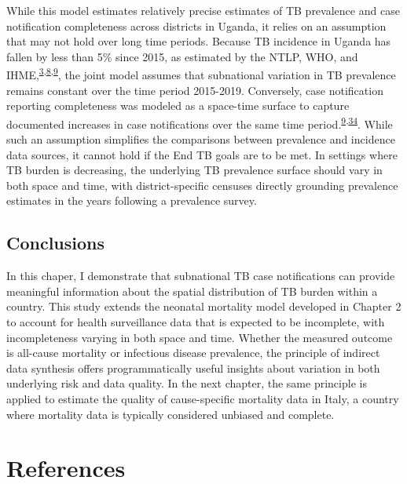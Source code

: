 \documentclass[
]{article}
\begin{document}
While this model estimates relatively precise estimates of TB prevalence and case notification completeness across districts in Uganda, it relies on an assumption that may not hold over long time periods. Because TB incidence in Uganda has fallen by less than 5\% since 2015, as estimated by the NTLP, WHO, and IHME,\textsuperscript{\protect\hyperlink{ref-WorldHealthOrganization2019}{3},\protect\hyperlink{ref-Kyu2018}{8},\protect\hyperlink{ref-UgandaNationalTuberculosisandLeprosyProgramme2020}{9}}, the joint model assumes that subnational variation in TB prevalence remains constant over the time period 2015-2019. Conversely, case notification reporting completeness was modeled as a space-time surface to capture documented increases in case notifications over the same time period.\textsuperscript{\protect\hyperlink{ref-UgandaNationalTuberculosisandLeprosyProgramme2020}{9},\protect\hyperlink{ref-UgandaNationalTuberculosisandLeprosyProgramme2017b}{34}}. While such an assumption simplifies the comparisons between prevalence and incidence data sources, it cannot hold if the End TB goals are to be met. In settings where TB burden is decreasing, the underlying TB prevalence surface should vary in both space and time, with district-specific censuses directly grounding prevalence estimates in the years following a prevalence survey.

\hypertarget{conclusions}{%
\subsection{Conclusions}\label{conclusions}}

In this chaper, I demonstrate that subnational TB case notifications can provide meaningful information about the spatial distribution of TB burden within a country. This study extends the neonatal mortality model developed in Chapter 2 to account for health surveillance data that is expected to be incomplete, with incompleteness varying in both space and time. Whether the measured outcome is all-cause mortality or infectious disease prevalence, the principle of indirect data synthesis offers programmatically useful insights about variation in both underlying risk and data quality. In the next chapter, the same principle is applied to estimate the quality of cause-specific mortality data in Italy, a country where mortality data is typically considered unbiased and complete.

\hypertarget{references}{%
\section{References}\label{references}}
\end{document}

